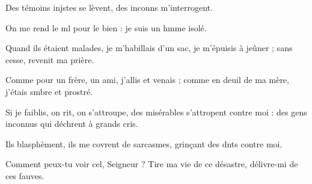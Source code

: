 \item Des témoins injstes se lèvent,\psstar{} des inconns m’interrogent.
\item On me rend le ml pour le bien :\psstar{} je suis un hmme isolé.
\item Quand ils étaient malades, je m’habillais d’un sac,\pscross{} je m’épuisis à jeûner ;\psstar{} sans cesse, revenit ma prière.
\item Comme pour un frère, un ami, j’allis et venais ;\psstar{} comme en deuil de ma mère, j’étais smbre et prostré.
\item Si je faiblis, on rit, on s’attroupe,\pscross{} des misérables s’attropent contre moi :\psstar{} des gens inconnus qui déchrent à grands cris.
\item Ils blasphèment, ils me covrent de sarcasmes,\psstar{} grinçant des dnts contre moi.
\item Comment peux-tu voir cel, Seigneur ?\psstar{} Tire ma vie de ce désastre, délivre-mi de ces fauves.
